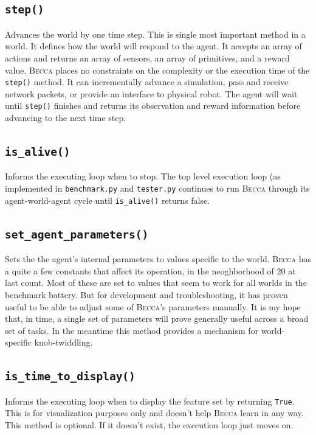 \subsection{\texttt{step()}}
Advances the world by one time step. This is single most important method in a world. It defines how the world will respond to the agent. It accepts an array of actions and returns an array of sensors, an array of primitives, and a reward value. \textsc{Becca} places no constraints on the complexity or the execution time of the \texttt{step()} method. It can incrementally advance a simulation, pass and receive network packets, or provide an interface to physical robot. The agent will wait until \texttt{step()} finishes and returns its observation and reward information before advancing to the next time step.

\subsection{\texttt{is\_alive()}}
Informs the executing loop when to stop. The top level execution loop (as implemented in \texttt{benchmark.py} and \texttt{tester.py} continues to run \textsc{Becca} through its agent-world-agent cycle until \texttt{is\_alive()} returns false.

\subsection{\texttt{set\_agent\_parameters()}}
Sets the the agent's internal parameters to values specific to the world. \textsc{Becca} has a quite a few constants that affect its operation, in the neoghborhood of 20 at last count. Most of these are set to values that seem to work for all worlds in the benchmark battery. But for development and troubleshooting, it has proven useful to be able to adjust some of \textsc{Becca}'s parameters manually. It is my hope that, in time, a single set of parameters will prove generally useful across a broad set of tasks. In the meantime this method provides a mechanism for world-specific knob-twiddling.

\subsection{\texttt{is\_time\_to\_display()}}
Informs the executing loop when to display the feature set by returning \texttt{True}. This is for visualization purposes only and doesn't help \textsc{Becca} learn in any way. This method is optional. If it doesn't exist, the execution loop just moves on.

